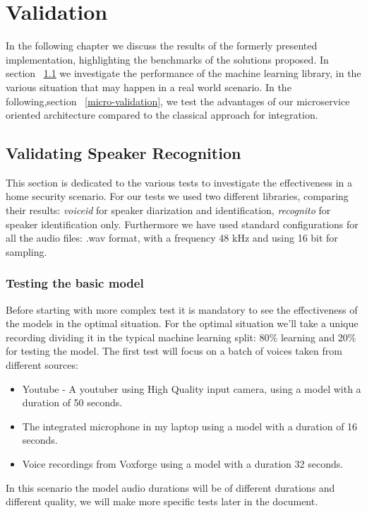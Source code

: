 \chapter{Validation}
\label{chap4}
In the following chapter we discuss the results of the formerly
presented implementation, highlighting the benchmarks of the solutions proposed.
In section ~\ref{speaker-validation} we investigate the performance of the machine learning
library, in the various situation that may happen in a real world scenario. In the following,section ~\ref{micro-validation},
we test the advantages of our microservice oriented architecture compared to the classical approach
for integration.

\section{Validating Speaker Recognition}
\label{speaker-validation}

This section is dedicated to the various tests to investigate
the effectiveness in a home security scenario. For our
tests we used two different libraries, comparing their results:
\textit{voiceid} for speaker diarization and identification, \textit{recognito}
for speaker identification only. Furthermore we have used standard configurations
for all the audio files: .wav format, with a frequency 48 kHz and using 16 bit for sampling.

\subsection{Testing the basic model}
\label{basic}

Before starting with more complex test it is mandatory to see the effectiveness
of the models in the optimal situation. For the optimal situation we'll take
a unique recording dividing it in the typical machine learning split: 80\% learning
and 20\% for testing the model.\newline
The first test will focus on a batch of voices taken from different sources:

\begin{itemize}
    \item Youtube -  A youtuber using High Quality input camera, using a model with a duration of 50 seconds.
    \item The integrated microphone in my laptop using a model with a duration of 16 seconds.
    \item Voice recordings from Voxforge using a model with a duration 32 seconds.
\end{itemize}
In this scenario the model audio durations will be of different durations and different
quality, we will make more specific tests later in the document.

